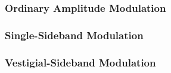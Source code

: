 \documentclass[]{article}
\begin{document}
\subsubsection{Ordinary Amplitude Modulation}

\subsubsection{Single-Sideband Modulation}

\subsubsection{Vestigial-Sideband Modulation}


\end{document}
